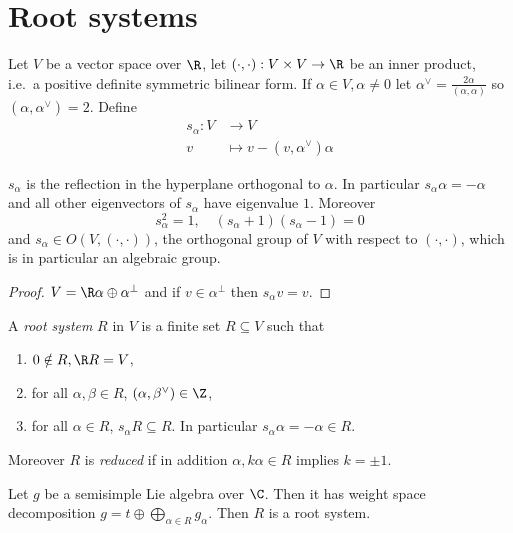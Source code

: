 \documentclass[a4paper]{article}
\begin{document}
\section{Root systems}

Let \(V\) be a vector space over \(\R\), let \((\cdot, \cdot): V \times V \to \R\) be an inner product, i.e.\ a positive definite symmetric bilinear form. If \(\alpha \in V, \alpha \neq 0\) let \(\alpha^\vee = \frac{2\alpha}{(\alpha, \alpha)}\) so \((\alpha, \alpha^\vee) = 2\). Define
\begin{align*}
  s_\alpha: V &\to V \\
  v &\mapsto v - (v, \alpha^\vee) \alpha
\end{align*}

\begin{lemma}
  \(s_\alpha\) is the reflection in the hyperplane orthogonal to \(\alpha\). In particular \(s_\alpha \alpha = -\alpha\) and all other eigenvectors of \(s_\alpha\) have eigenvalue \(1\). Moreover
  \[
    s_\alpha^2 = 1, \quad (s_\alpha + 1)(s_\alpha - 1) = 0
  \]
  and \(s_\alpha \in O(V, (\cdot, \cdot))\), the orthogonal group of \(V\) with respect to \((\cdot, \cdot)\), which is in particular an algebraic group.
\end{lemma}

\begin{proof}
  \(V = \R\alpha \oplus \alpha^\perp\) and if \(v \in \alpha^\perp\) then \(s_\alpha v = v\).
\end{proof}

\begin{definition}
  A \emph{root system} \(R\) in \(V\) is a finite set \(R \subseteq V\) such that
  \begin{enumerate}
  \item \(0 \notin R, \R R = V\),
  \item for all \(\alpha, \beta \in R\), \((\alpha, \beta^\vee) \in \Z\),
  \item for all \(\alpha \in R\), \(s_\alpha R \subseteq R\). In particular \(s_\alpha \alpha = -\alpha \in R\).
  \end{enumerate}
  Moreover \(R\) is \emph{reduced} if in addition \(\alpha, k \alpha \in R\) implies \(k = \pm 1\).
\end{definition}

\begin{eg}
  Let \(g\) be a semisimple Lie algebra over \(\C\). Then it has weight space decomposition \(g = t \oplus \bigoplus_{\alpha \in R} g_\alpha\). Then \(R\) is a root system.
\end{eg}
\end{document}
